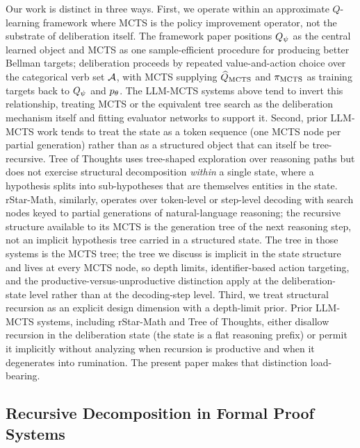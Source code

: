 Our work is distinct in three ways. First, we operate within an
approximate $Q$-learning framework where MCTS is the policy improvement
operator, not the substrate of deliberation itself. The framework paper
positions $Q_{\psi}$ as the central learned object and MCTS as one
sample-efficient procedure for producing better Bellman targets;
deliberation proceeds by repeated value-and-action choice over the
categorical verb set $\mathcal{A}$, with MCTS supplying $\widehat{Q}_{\mathrm{MCTS}}$ and
$\pi_{\mathrm{MCTS}}$ as training targets back to $Q_{\psi}$ and $p_{\theta}$. The
LLM-MCTS systems above tend to invert this relationship, treating MCTS
or the equivalent tree search as the deliberation mechanism itself and
fitting evaluator networks to support it. Second, prior LLM-MCTS work
tends to treat the state as a token sequence (one MCTS node per partial
generation) rather than as a structured object that can itself be
tree-recursive. Tree of Thoughts uses tree-shaped exploration over
reasoning paths but does not exercise structural decomposition
\emph{within} a single state, where a hypothesis splits into
sub-hypotheses that are themselves entities in the state. rStar-Math,
similarly, operates over token-level or step-level decoding with
search nodes keyed to partial generations of natural-language
reasoning; the recursive structure available to its MCTS is the
generation tree of the next reasoning step, not an implicit hypothesis
tree carried in a structured state. The tree in those systems is the
MCTS tree; the tree we discuss is implicit in the state structure and
lives at every MCTS node, so depth limits, identifier-based action
targeting, and the productive-versus-unproductive distinction apply at
the deliberation-state level rather than at the decoding-step level.
Third, we treat structural recursion as an explicit design dimension
with a depth-limit prior. Prior LLM-MCTS systems, including rStar-Math
and Tree of Thoughts, either disallow recursion in the deliberation
state (the state is a flat reasoning prefix) or permit it implicitly
without analyzing when recursion is productive and when it degenerates
into rumination. The present paper makes that distinction
load-bearing.

\subsection{Recursive Decomposition in Formal Proof Systems}
\label{sec:rw-proof}

